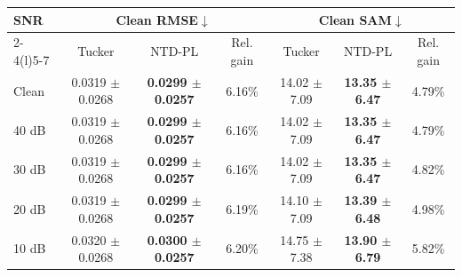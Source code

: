 \begin{tabular}{@{}lcccccc@{}}
\toprule
\multirow{2}{*}{SNR} &
\multicolumn{3}{c}{Clean RMSE$\downarrow$} &
\multicolumn{3}{c}{Clean SAM$\downarrow$} \\
\cmidrule(lr){2-4}\cmidrule(l){5-7}
& Tucker & NTD-PL & Rel. gain &
Tucker & NTD-PL & Rel. gain \\
\midrule
Clean & 0.0319 $\pm$ 0.0268 & \textbf{0.0299 $\pm$ 0.0257} & 6.16\%
& 14.02 $\pm$ 7.09 & \textbf{13.35 $\pm$ 6.47} & 4.79\% \\
40 dB & 0.0319 $\pm$ 0.0268 & \textbf{0.0299 $\pm$ 0.0257} & 6.16\%
& 14.02 $\pm$ 7.09 & \textbf{13.35 $\pm$ 6.47} & 4.79\% \\
30 dB & 0.0319 $\pm$ 0.0268 & \textbf{0.0299 $\pm$ 0.0257} & 6.16\%
& 14.02 $\pm$ 7.09 & \textbf{13.35 $\pm$ 6.47} & 4.82\% \\
20 dB & 0.0319 $\pm$ 0.0268 & \textbf{0.0299 $\pm$ 0.0257} & 6.19\%
& 14.10 $\pm$ 7.09 & \textbf{13.39 $\pm$ 6.48} & 4.98\% \\
10 dB & 0.0320 $\pm$ 0.0268 & \textbf{0.0300 $\pm$ 0.0257} & 6.20\%
& 14.75 $\pm$ 7.38 & \textbf{13.90 $\pm$ 6.79} & 5.82\% \\
\bottomrule
\end{tabular}

